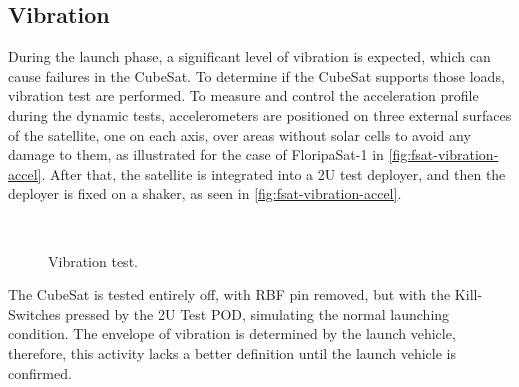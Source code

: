 \subsection{Vibration}

During the launch phase, a significant level of vibration is expected, which can cause failures in the CubeSat. To determine if the CubeSat supports those loads, vibration test are performed. To measure and control the acceleration profile during the dynamic tests, accelerometers are positioned on three external surfaces of the satellite, one on each axis, over areas without solar cells to avoid any damage to them, as illustrated for the case of FloripaSat-1 in \autoref{fig:fsat-vibration-accel}. After that, the satellite is integrated into a 2U test deployer, and then the deployer is fixed on a shaker, as seen in \autoref{fig:fsat-vibration-accel}.

\begin{figure}[!htb]
    \begin{center}
        ~
        \caption{Vibration test.}
        \label{fig:vibration-test}
    \end{center}
\end{figure}

The CubeSat is tested entirely off, with RBF pin removed, but with the Kill-Switches pressed by the 2U Test POD, simulating the normal launching condition. The envelope of vibration is determined by the launch vehicle, therefore, this activity lacks a better definition until the launch vehicle is confirmed.


